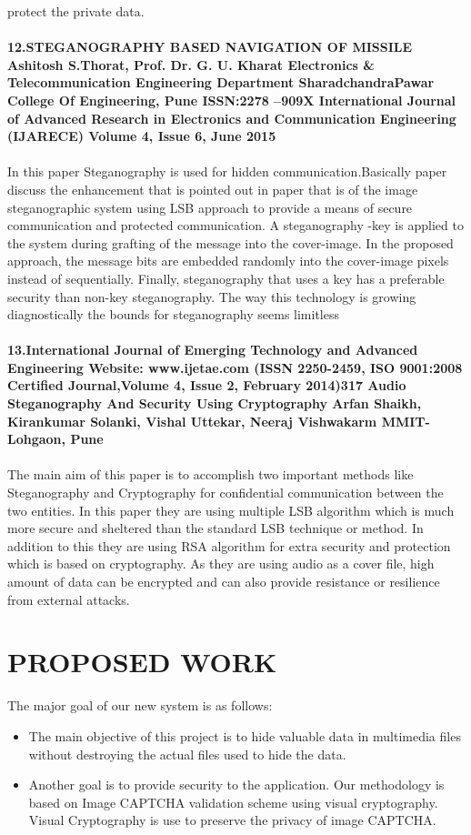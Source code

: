 \documentclass[12pt]{extreport}
\begin{document}
protect the private data.\\\\
\textbf{12.STEGANOGRAPHY BASED NAVIGATION OF MISSILE
Ashitosh S.Thorat,
Prof. Dr. G. U. Kharat
Electronics & Telecommunication Engineering Department
SharadchandraPawar College Of Engineering, Pune
ISSN:2278 –909X International Journal of Advanced Research in Electronics and Communication Engineering (IJARECE) Volume 4, Issue 6, June 2015}\\\\
In this paper Steganography is used for hidden communication.Basically paper discuss the enhancement that is pointed out in paper that is of the image steganographic system using LSB approach to provide a means of secure communication and protected communication.  A steganography -key is applied to the system during grafting of the message into the cover-image. In the proposed approach, the message bits are embedded randomly into the cover-image pixels instead of sequentially. Finally, steganography that uses a key has a preferable security than non-key steganography. The way this technology is growing diagnostically the bounds for steganography seems limitless\\\\
\textbf{13.International Journal of Emerging Technology and Advanced Engineering
Website: www.ijetae.com (ISSN 2250-2459, ISO 9001:2008 Certified Journal,Volume 4, Issue 2, February 2014)317 Audio Steganography And Security Using Cryptography
Arfan Shaikh, Kirankumar Solanki, Vishal Uttekar, Neeraj Vishwakarm MMIT-Lohgaon, Pune}\\\\
The main aim of this paper is to accomplish  two important methods like Steganography and Cryptography for confidential communication between the two entities. In this  paper they are using multiple LSB algorithm which is much more secure and sheltered than the standard LSB technique or method. In addition to this they are using RSA algorithm for extra security and protection which is based on cryptography. As they are using audio as a cover file, high amount of data can be encrypted and can also provide resistance or resilience from external attacks.


\newpage

\section{PROPOSED WORK}
The major goal of our new system is as follows:
\begin{itemize}

\item The  main  objective  of  this  project  is  to  hide valuable data  in  multimedia files without destroying the actual files used to hide the data.
\item   Another goal is to provide security  to  the application. Our  methodology  is  based  on  Image  CAPTCHA validation scheme using visual cryptography.  Visual Cryptography is use to preserve the privacy of image CAPTCHA.
\end{itemize}
\end{document}
